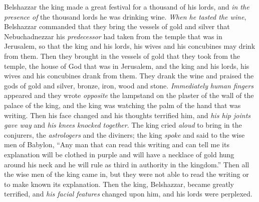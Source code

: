 \begin{biblechapter} %
 Belshazzar the king made a great festival for a thousand of his lords, and \textit{in the presence of} the thousand lords he was drinking wine.
\verse \textit{When he tasted the wine}, Belshazzar commanded that they bring the vessels of gold and silver that Nebuchadnezzar his \textit{predecessor} had taken from the temple that was in Jerusalem, so that the king and his lords, his wives and his concubines may drink from them.
\verse Then they brought in the vessels of gold that they took from the temple, the house of God that was in Jerusalem, and the king and his lords, his wives and his concubines drank from them.
\verse They drank the wine and praised the gods of gold and silver, bronze, iron, wood and stone.
\verse \textit{Immediately} \textit{human fingers} appeared and they wrote \textit{opposite} the lampstand on the plaster of the wall of the palace of the king, and the king was watching the palm of the hand that was writing.
\verse Then his face changed and his thoughts terrified him, and \textit{his hip joints gave way} and \textit{his knees knocked together}.
\verse The king cried \textit{aloud} to bring in the conjurers, the \textit{astrologers} and the diviners; the king \textit{spoke} and said to the wise men of Babylon, “Any man that can read this writing and can tell me its explanation will be clothed in purple and will have a necklace of gold hung around his neck and he will rule as third in authority in the kingdom.”
\verse Then all the wise men of the king came in, but they were not able to read the writing or to make known its explanation.
\verse Then the king, Belshazzar, became greatly terrified, and \textit{his facial features} changed upon him, and his lords were perplexed.

\end{biblechapter}
